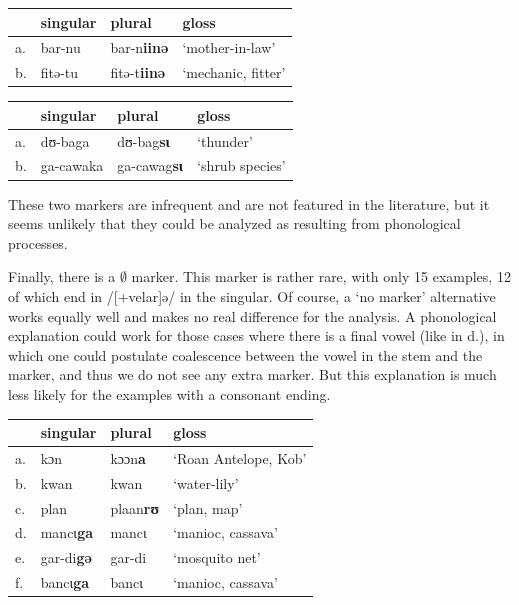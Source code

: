 \begin{exe}
    \ex \label{inne-kasem}
    \begin{tabular}[t]{llll}
      & singular & plural    & gloss              \\
      \midrule
      a. & bar-nu   & bar-n\textbf{iinə}  & `mother-in-law'    \\
      b. & fitə-tu  & fitə-t\textbf{iinə} & `mechanic, fitter' \\
    \end{tabular}
\end{exe}

\begin{exe}
    \ex \label{si-kasem}
    \begin{tabular}[t]{llll}
      & singular  & plural     & gloss           \\
      \midrule
      a. & dʊ-baga   & dʊ-bag\textbf{sɩ}   & `thunder'       \\
      b. & ga-cawaka & ga-cawag\textbf{sɩ} & `shrub species' \\
    \end{tabular}
\end{exe}

These two markers are infrequent and are not featured in the literature, but it seems unlikely that they could be analyzed as resulting from phonological processes.

Finally, there is a $\emptyset$ marker. This marker is rather rare, with only 15 examples, 12 of which end in /[+velar]ə/ in the singular. Of course, a `no marker' alternative works equally well and makes no real difference for the analysis. A phonological explanation could work for those cases where there is a final vowel (like in d.), in which one could postulate coalescence between the vowel in the stem and the marker, and thus we do not see any extra marker. But this explanation is much less likely for the examples with a consonant ending.

\begin{exe}
    \ex \label{0-kasem}
    \begin{tabular}[t]{llll}
      & singular          & plural           & gloss                \\
      \midrule
      a. & kɔn               & kɔɔn\textbf{a}   & `Roan Antelope, Kob' \\
      b. & kwan              & kwan             & `water-lily'         \\
      c. & plan              & plaan\textbf{rʊ} & `plan, map'          \\
      d. & mancɩ\textbf{ga}  & mancɩ            & `manioc, cassava'    \\
      e. & gar-di\textbf{gə} & gar-di           & `mosquito net'       \\
      f. & bancɩ\textbf{ga}  & bancɩ            & `manioc, cassava'    \\
    \end{tabular}
\end{exe}


